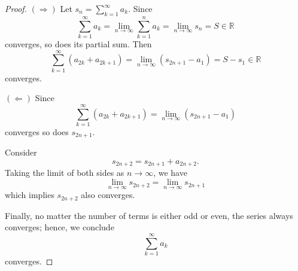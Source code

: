 \begin{Exercise}
\begin{proof}
$(\Longrightarrow)$
Let $s_n = \sum_{k=1}^{\infty}a_k$. Since 
$$
\sum_{k=1}^{\infty}a_k 
= \lim_{n\to\infty}\sum_{k=1}^{n}a_k 
= \lim_{n\to\infty}s_n 
= S \in \mathbb{R}
$$
converges, so does its partial sum. Then 
$$
\sum_{k=1}^{\infty}(a_{2k}+a_{2k+1}) 
= \lim_{n\to\infty}(s_{2n+1}-a_1) 
= S-s_1 \in \mathbb{R}
$$ 
converges. 

\vspace{2ex}

$(\Longleftarrow)$ 
Since
$$
\sum_{k=1}^{\infty}(a_{2k}+a_{2k+1}) 
= \lim_{n\to\infty}(s_{2n+1}-a_1)
$$ 
converges so does $s_{2n+1}$. 

Consider 
$$
s_{2n+2} = s_{2n+1}+a_{2n+2}.
$$
Taking the limit of both sides as $n\to\infty$, we have 
$$
\lim_{n\to\infty}s_{2n+2}
= \lim_{n\to\infty}s_{2n+1}
$$
which implies $s_{2n+2}$ also converges.

Finally, no matter the number of terms is either odd or even, the series always converges; hence, we conclude 
$$ 
\sum_{k=1}^{\infty}a_k
$$ 
converges.
\end{proof}
\end{Exercise}